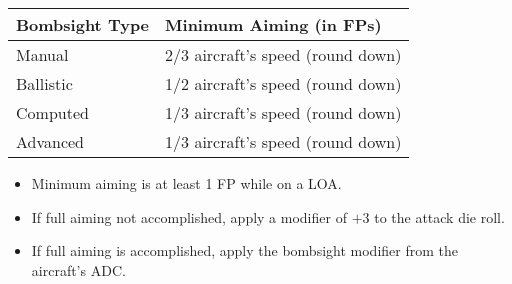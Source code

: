 
\begin{onecolumntablefloat}
\begin{onecolumntable}

\begin{tabularx}{0.9\linewidth}{lP}
\toprule
Bombsight Type  &Minimum Aiming (in FPs)\\
\midrule
Manual 	        &2/3 aircraft's speed (round down)\\
Ballistic	    &1/2 aircraft's speed (round down)\\
Computed	    &1/3 aircraft's speed (round down)\\
Advanced	    &1/3 aircraft's speed (round down)\\
\bottomrule
\end{tabularx}
\begin{tablenote}{0.9\linewidth}
\begin{itemize}
\item Minimum aiming is at least 1 FP while on a LOA.
\item If full aiming not accomplished, apply a modifier of $+3$ to the attack die roll.
\item If full aiming is accomplished, apply the bombsight modifier from the aircraft's ADC.
\end{itemize}
\end{tablenote}

\end{onecolumntable}
\end{onecolumntablefloat}
